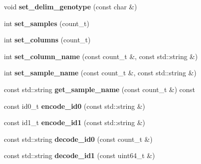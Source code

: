 \begin{DoxyCompactItemize}
\item 
\hypertarget{classgcf__file_a50310534d652f648d10d994f357d1f90}{void {\bfseries set\-\_\-delim\-\_\-genotype} (const char \&)}\label{classgcf__file_a50310534d652f648d10d994f357d1f90}

\item 
\hypertarget{classgcf__file_a321fe35c3aee4a72ff85de2622411ca6}{int {\bfseries set\-\_\-samples} (count\-\_\-t)}\label{classgcf__file_a321fe35c3aee4a72ff85de2622411ca6}

\item 
\hypertarget{classgcf__file_a8e7faa4ed9cf9f6f3c28eef075a1e07f}{int {\bfseries set\-\_\-columns} (count\-\_\-t)}\label{classgcf__file_a8e7faa4ed9cf9f6f3c28eef075a1e07f}

\item 
\hypertarget{classgcf__file_a2fff7eb8de9839dbc5d8113cb6ca431e}{int {\bfseries set\-\_\-column\-\_\-name} (const count\-\_\-t \&, const std\-::string \&)}\label{classgcf__file_a2fff7eb8de9839dbc5d8113cb6ca431e}

\item 
\hypertarget{classgcf__file_af594006220f3e06dce26347ae9c94160}{int {\bfseries set\-\_\-sample\-\_\-name} (const count\-\_\-t \&, const std\-::string \&)}\label{classgcf__file_af594006220f3e06dce26347ae9c94160}

\item 
\hypertarget{classgcf__file_aed4d8e9eda04043f017becb9c8d1ffe1}{const std\-::string {\bfseries get\-\_\-sample\-\_\-name} (const count\-\_\-t \&) const }\label{classgcf__file_aed4d8e9eda04043f017becb9c8d1ffe1}

\item 
\hypertarget{classgcf__file_a478403b0bf4381298d8e8122fac3c177}{const id0\-\_\-t {\bfseries encode\-\_\-id0} (const std\-::string \&)}\label{classgcf__file_a478403b0bf4381298d8e8122fac3c177}

\item 
\hypertarget{classgcf__file_af70c303558c7b72d3bcdd962600de3bf}{const id1\-\_\-t {\bfseries encode\-\_\-id1} (const std\-::string \&)}\label{classgcf__file_af70c303558c7b72d3bcdd962600de3bf}

\item 
\hypertarget{classgcf__file_aa8c3617603afcd5f221fd46e517d30a7}{const std\-::string {\bfseries decode\-\_\-id0} (const count\-\_\-t \&)}\label{classgcf__file_aa8c3617603afcd5f221fd46e517d30a7}

\item 
\hypertarget{classgcf__file_ad235c8322d316c61f3edd8192c138ee8}{const std\-::string {\bfseries decode\-\_\-id1} (const uint64\-\_\-t \&)}\label{classgcf__file_ad235c8322d316c61f3edd8192c138ee8}


\end{DoxyCompactItemize}
